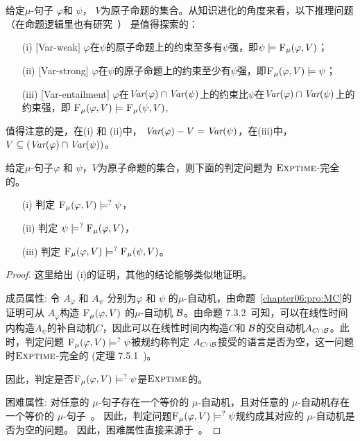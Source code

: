 给定$\mu$-句子 $\varphi$和 $\psi$， $V$为原子命题的集合。从知识进化的角度来看，以下推理问题（在命题逻辑里也有研究~\cite{wang2015forgetting}） 是值得探索的：

\begin{itemize}
	\item[(i)] $[$Var-weak$]$ $\varphi$在$\psi$的原子命题上的约束至多有$\psi$强，即$\psi\models {\textsc{F}_{\textsc{$\mu$}}}(\varphi, V)$；
	\item[(ii)] $[$Var-strong$]$ $\varphi$在$\psi$的原子命题上的约束至少有$\psi$强，即${\textsc{F}_{\textsc{$\mu$}}}(\varphi, V)\models \psi$；
	\item[(iii)] $[$Var-entailment$]$ $\varphi$在$\textit{Var}(\varphi) \cap \textit{Var}(\psi)$上的约束比$\psi$在$\textit{Var}(\varphi) \cap \textit{Var}(\psi)$上的约束强，即 ${\textsc{F}_{\textsc{$\mu$}}}(\varphi, V) \models {\textsc{F}_{\textsc{$\mu$}}}(\psi, V)$,
\end{itemize}
值得注意的是，在(i) 和 (ii)中， $\textit{Var}(\varphi) - V = \textit{Var}(\psi)$，在(iii)中， $V \subseteq (\textit{Var}(\varphi) \cap \textit{Var}(\psi))$。

\begin{theorem}[Entailment]
	\label{thm:Ent}
	给定$\mu$-句子$\varphi$ 和 $\psi$，$V$为原子命题的集合，则下面的判定问题为 $\textsc{Exptime}$-完全的。
	\begin{itemize}
		\item[(i)] 判定  ${\textsc{F}_{\textsc{$\mu$}}}(\varphi, V ) \models^? \psi$，
		\item[(ii)] 判定  $\psi \models^? {\textsc{F}_{\textsc{$\mu$}}}(\varphi, V)$，
		\item[(iii)] 判定 ${\textsc{F}_{\textsc{$\mu$}}}(\varphi, V) \models^? {\textsc{F}_{\textsc{$\mu$}}}(\psi, V)$。
	\end{itemize}
\end{theorem}
\begin{proof}
	这里给出 (i)的证明，其他的结论能够类似地证明。
	
	
	成员属性: 令 $A_{\varphi}$ 和 $A_{\psi}$ 分别为$\varphi$ 和 $\psi$ 的$\mu$-自动机，由命题~\ref{chapter06:pro:MC}的证明可从 $A_{\varphi}$构造 ${\textsc{F}_{\textsc{$\mu$}}}(\varphi, V )$ 的$\mu$-自动机 ${\cal B}$。由命题 7.3.2~\cite{comon1997tree}可知，可以在线性时间内构造$A_\psi$的补自动机$C$，因此可以在线性时间内构造$C$和 ${\cal B}$的交自动机$A_{C \cap {\cal B}}$。此时，判定问题 ${\textsc{F}_{\textsc{$\mu$}}}(\varphi, V ) \models^? \psi$被规约称判定 $A_{C \cap {\cal B}}$接受的语言是否为空，这一问题时$\textsc{Exptime}$-完全的 (定理 7.5.1~\cite{comon1997tree})。
	
	因此，判定是否${\textsc{F}_{\textsc{$\mu$}}}(\varphi, V ) \models^? \psi$是$\textsc{Exptime}$的。 
	
	困难属性: 对任意的 $\mu$-句子存在一个等价的 $\mu$-自动机，且对任意的 $\mu$-自动机存在一个等价的 $\mu$-句子~\cite{bradfield2018mu}。
因此，判定问题${\textsc{F}_{\textsc{$\mu$}}}(\varphi, V ) \models^? \psi$规约成其对应的 $\mu$-自动机是否为空的问题。
	因此，困难属性直接来源于~\cite{bradfield2018mu,comon1997tree}。
\end{proof}


